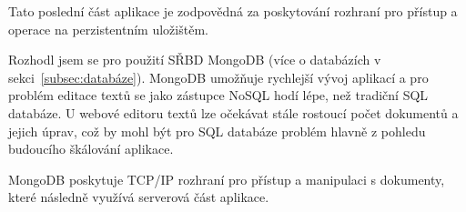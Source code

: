 Tato poslední část aplikace je zodpovědná za poskytování rozhraní pro přístup a operace na perzistentním uložištěm.

Rozhodl jsem se pro použití \gls{SŘBD} MongoDB (více o databázích v sekci~\ref{subsec:databáze}).
MongoDB umožňuje rychlejší vývoj aplikací a pro problém editace textů se jako zástupce \gls{NoSQL} hodí lépe, než tradiční \gls{SQL} databáze.
U webové editoru textů lze očekávat stále rostoucí počet dokumentů a jejich úprav, což by mohl být pro \gls{SQL} databáze problém hlavně z pohledu budoucího škálování aplikace.

MongoDB poskytuje \gls{TCP/IP} rozhraní pro přístup a manipulaci s dokumenty, které následně využívá serverová část aplikace.

